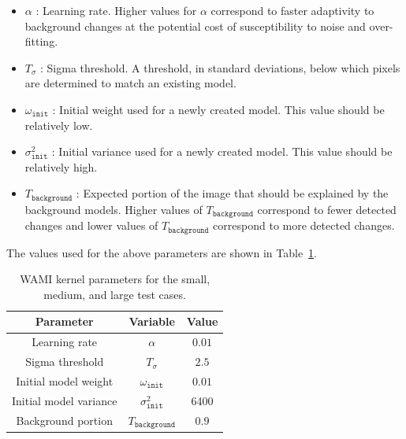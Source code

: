 \documentclass{report}
\begin{document}
\begin{itemize}
    \item $\alpha$ : Learning rate. Higher values for $\alpha$ correspond to faster adaptivity
    to background changes at the potential cost of susceptibility to noise and over-fitting.
    \item $T_\sigma$ : Sigma threshold. A threshold, in standard deviations, below which
    pixels are determined to match an existing model.
    \item $\omega_\texttt{init}$ : Initial weight used for a newly created model. This value
    should be relatively low.
    \item $\sigma^2_\texttt{init}$ : Initial variance used for a newly created model. This value
    should be relatively high.
    \item $T_\texttt{background}$ : Expected portion of the image that should be explained by
    the background models. Higher values of $T_\texttt{background}$ correspond to fewer detected
    changes and lower values of $T_\texttt{background}$ correspond to more detected changes.
\end{itemize}
The values used for the above parameters are shown in Table~\ref{tbl:wami:gmm-params}.

\begin{table}[t]
    \begin{center}
    \caption{WAMI kernel parameters for the small, medium, and large test cases.}
    \begin{tabular}{|c|c|c|}
        \hline
        Parameter & Variable & Value \\ \hline
        Learning rate & $\alpha$ & $0.01$ \\ \hline
        Sigma threshold & $T_\sigma$ & $2.5$ \\ \hline
        Initial model weight & $\omega_\texttt{init}$ & $0.01$ \\ \hline
        Initial model variance & $\sigma^2_\texttt{init}$ & 6400 \\ \hline
        Background portion & $T_\texttt{background}$ & $0.9$ \\ \hline
    \end{tabular}
    \label{tbl:wami:gmm-params}
    \end{center}
\end{table}
\end{document}
